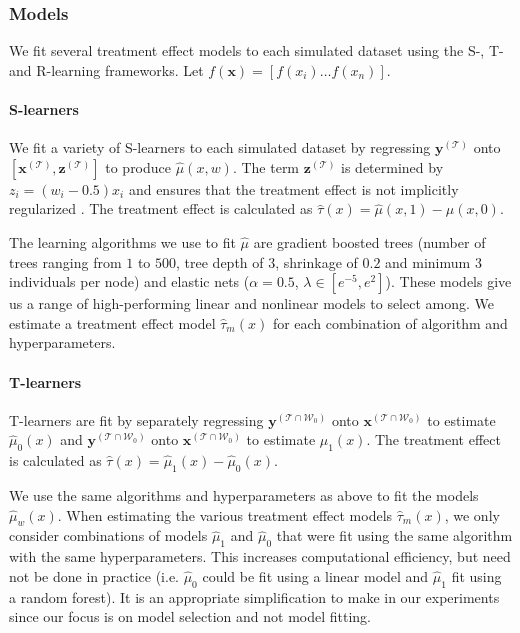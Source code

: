 \subsubsection{Models}

We fit several treatment effect models to each simulated dataset using the S-, T- and R-learning frameworks. Let $f(\bm x) = [f(x_i) \dots f(x_n)]$.

\paragraph{S-learners} We fit a variety of S-learners to each simulated dataset by regressing $\bm y^{(\mathcal T)}$ onto $[\bm x^{(\mathcal T)}, \bm z^{(\mathcal T)}]$ to produce $\hat\mu(x,w)$. The term $\bm z^{(\mathcal T)}$ is determined by $z_i = ( w_i- 0.5) x_i$ and ensures that the treatment effect is not implicitly regularized \cite{Nie:2017vi}. The treatment effect is calculated as $\hat\tau(x) = \hat\mu(x,1) - \hat\mu(x,0)$. 

The learning algorithms we use to fit $\hat\mu$ are gradient boosted trees (number of trees ranging from $1$ to $500$, tree depth of $3$, shrinkage of $0.2$ and minimum $3$ individuals per node) and elastic nets ($\alpha=0.5$, $\lambda \in [e^{-5}, e^2]$). These models give us a range of high-performing linear and nonlinear models to select among. We estimate a treatment effect model $\hat\tau_m(x)$ for each combination of algorithm and hyperparameters.

\paragraph{T-learners} T-learners are fit by separately regressing $\bm y^{(\mathcal T \cap \mathcal W_0)}$ onto $\bm x^{(\mathcal T \cap \mathcal W_0)}$ to estimate $\hat\mu_0(x)$ and $\bm y^{(\mathcal T \cap \mathcal W_0)}$ onto $\bm x^{(\mathcal T \cap \mathcal W_0)}$ to estimate $\hat\mu_1(x)$. The treatment effect is calculated as $\hat\tau(x) = \hat\mu_1(x) - \hat\mu_0(x)$. 

We use the same algorithms and hyperparameters as above to fit the models $\hat\mu_w(x)$. When estimating the various treatment effect models $\hat\tau_m(x)$, we only consider combinations of models $\hat\mu_1$ and $\hat\mu_0$ that were fit using the same algorithm with the same hyperparameters. This increases computational efficiency, but need not be done in practice (i.e. $\hat\mu_0$ could be fit using a linear model and $\hat\mu_1$ fit using a random forest). It is an appropriate simplification to make in our experiments since our focus is on model selection and not model fitting.

